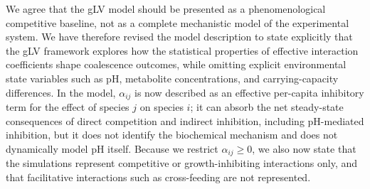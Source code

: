 
\responselabel We agree that the gLV model should be presented as a phenomenological competitive baseline, not as a complete mechanistic model of the experimental system. We have therefore revised the model description to state explicitly that the gLV framework explores how the statistical properties of effective interaction coefficients shape coalescence outcomes, while omitting explicit environmental state variables such as pH, metabolite concentrations, and carrying-capacity differences. In the model, $\alpha_{ij}$ is now described as an effective per-capita inhibitory term for the effect of species $j$ on species $i$; it can absorb the net steady-state consequences of direct competition and indirect inhibition, including pH-mediated inhibition, but it does not identify the biochemical mechanism and does not dynamically model pH itself. Because we restrict $\alpha_{ij} \geq 0$, we also now state that the simulations represent competitive or growth-inhibiting interactions only, and that facilitative interactions such as cross-feeding are not represented.

